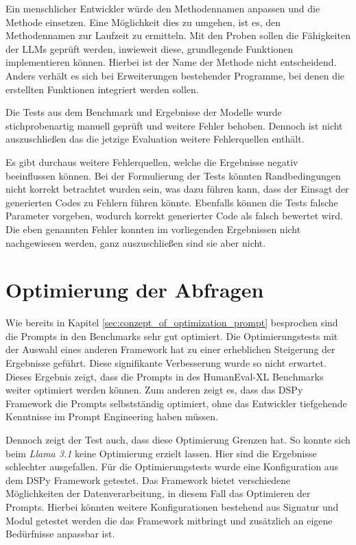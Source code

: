 Ein menschlicher Entwickler würde den Methodennamen anpassen und die Methode einsetzen. Eine Möglichkeit dies zu umgehen, ist es, den Methodennamen zur Laufzeit zu ermitteln. Mit den Proben sollen die Fähigkeiten der LLMs geprüft werden, inwieweit diese, grundlegende Funktionen implementieren können. Hierbei ist der Name der Methode nicht entscheidend. Anders verhält es sich bei Erweiterungen bestehender Programme, bei denen die erstellten Funktionen integriert werden sollen.\vspace{0.2cm}

Die Tests aus dem Benchmark und Ergebnisse der Modelle wurde stichprobenartig manuell geprüft und weitere Fehler behoben. Dennoch ist nicht auszuschließen das die jetzige Evaluation weitere Fehlerquellen enthält.\vspace{0.2cm}

Es gibt durchaus weitere Fehlerquellen, welche die Ergebnisse negativ beeinflussen können. Bei der Formulierung der Tests könnten Randbedingungen nicht korrekt betrachtet wurden sein, was dazu führen kann, dass der Einsagt der generierten Codes zu Fehlern führen könnte. Ebenfalls können die Tests falsche Parameter vorgeben, wodurch korrekt generierter Code als falsch bewertet wird. Die eben genannten Fehler konnten im vorliegenden Ergebnissen nicht nachgewiesen werden, ganz auszuschließen sind sie aber nicht.\vspace{0.2cm}



\section{Optimierung der Abfragen}
Wie bereits in Kapitel \ref{sec:conzept_of_optimization_prompt} besprochen sind die Prompts in den Benchmarks sehr gut optimiert. Die Optimierungstests mit der Auswahl eines anderen Framework hat zu einer erheblichen Steigerung der Ergebnisse geführt. Diese signifikante Verbesserung wurde so nicht erwartet. Dieses Ergebnis zeigt, dass die Prompts in des HumanEval-XL Benchmarks weiter optimiert werden können. Zum anderen zeigt es, dass das DSPy Framework die Prompts selbstständig optimiert, ohne das Entwickler tiefgehende Kenntnisse im Prompt Engineering haben müssen.\vspace{0.2cm}

Dennoch zeigt der Test auch, dass diese Optimierung Grenzen hat. So konnte sich beim \textit{Llama 3.1} keine Optimierung erzielt lassen. Hier sind die Ergebnisse schlechter ausgefallen. Für die Optimierungstests wurde eine Konfiguration aus dem DSPy Framework getestet. Das Framework bietet verschiedene Möglichkeiten der Datenverarbeitung, in diesem Fall das Optimieren der Prompts. Hierbei könnten weitere Konfigurationen bestehend aus Signatur und Modul getestet werden die das Framework mitbringt und zusätzlich an eigene Bedürfnisse anpassbar ist.\vspace{0.2cm}

